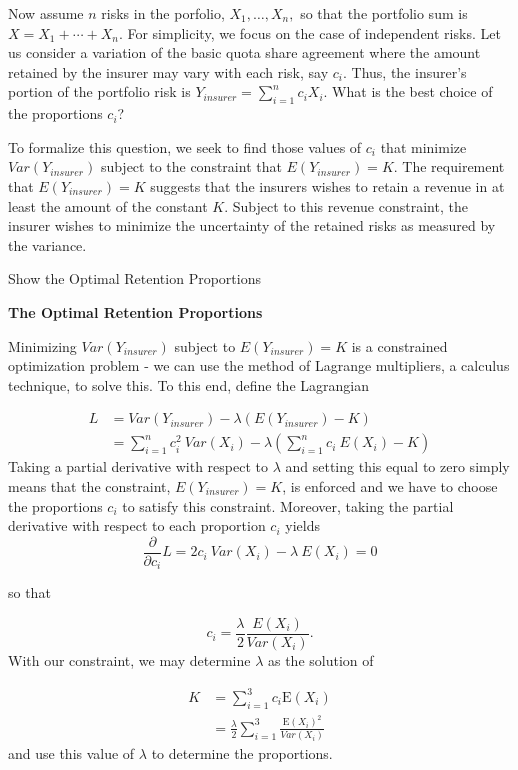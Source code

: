 \documentclass[]{book}
\theoremstyle{definition}
\theoremstyle{definition}
\theoremstyle{definition}
\theoremstyle{remark}
\begin{document}
Now assume \(n\) risks in the porfolio, \(X_1, \ldots, X_n,\) so that
the portfolio sum is \(X= X_1 + \cdots + X_n\). For simplicity, we focus
on the case of independent risks. Let us consider a variation of the
basic quota share agreement where the amount retained by the insurer may
vary with each risk, say \(c_i\). Thus, the insurer's portion of the
portfolio risk is \(Y_{insurer} = \sum_{i=1}^n c_i X_i\). What is the
best choice of the proportions \(c_i\)?

To formalize this question, we seek to find those values of \(c_i\) that
minimize \(Var (Y_{insurer})\) subject to the constraint that
\(E (Y_{insurer}) = K.\) The requirement that \(E (Y_{insurer}) = K\)
suggests that the insurers wishes to retain a revenue in at least the
amount of the constant \(K\). Subject to this revenue constraint, the
insurer wishes to minimize the uncertainty of the retained risks as
measured by the variance.

Show the Optimal Retention Proportions

\hypertarget{toggleDerivationProof}{}
\textbf{The Optimal Retention Proportions}

Minimizing \(Var(Y_{insurer})\) subject to \(E(Y_{insurer}) = K\) is a
constrained optimization problem - we can use the method of Lagrange
multipliers, a calculus technique, to solve this. To this end, define
the Lagrangian

\[
\begin{array}{ll}
L &= Var (Y_{insurer}) - \lambda (E (Y_{insurer}) - K) \\
&= \sum_{i=1}^n c_i^2 ~Var(X_i) - \lambda (\sum_{i=1}^n c_i ~E(X_i) - K) 
\end{array}
\] Taking a partial derivative with respect to \(\lambda\) and setting
this equal to zero simply means that the constraint,
\(E(Y_{insurer}) = K\), is enforced and we have to choose the
proportions \(c_i\) to satisfy this constraint. Moreover, taking the
partial derivative with respect to each proportion \(c_i\) yields \[
\frac{\partial}{\partial c_i} L = 2 c_i ~Var(X_i) - \lambda ~E(X_i) = 0 
\]

so that

\[
c_i  =  \frac{\lambda}{2} \frac{E(X_i)}{Var(X_i)} .
\] With our constraint, we may determine \(\lambda\) as the solution of

\[
\begin{array}{ll}
K &= \sum_{i=1}^3 c_i \mathrm{E}(X_i) \\
&= \frac{\lambda}{2} \sum_{i=1}^3 \frac{\mathrm{E}(X_i)^2}{Var(X_i)} 
\end{array}
\] and use this value of \(\lambda\) to determine the proportions.
\end{document}
